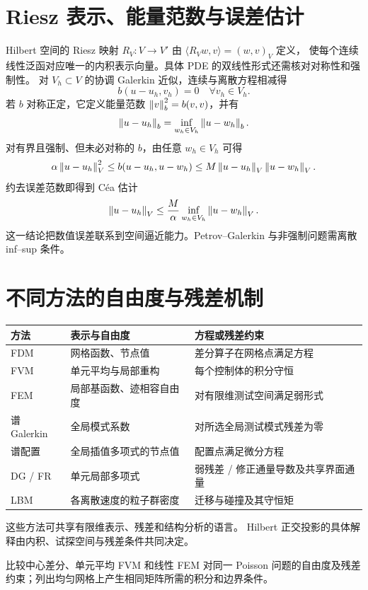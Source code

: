 \section{Riesz 表示、能量范数与误差估计}
Hilbert 空间的 Riesz 映射 $R_V:V\to V'$ 由
$\langle R_Vw,v\rangle=(w,v)_V$ 定义，
使每个连续线性泛函对应唯一的内积表示向量。具体 PDE 的双线性形式还需核对对称性和强制性。
对 $V_h\subset V$ 的协调 Galerkin 近似，连续与离散方程相减得
\[
b(u-u_h,v_h)=0\quad\forall v_h\in V_h.
\]
若 $b$ 对称正定，它定义能量范数 $\left\lVert v\right\rVert_b^2=b(v,v)$，并有
\[
\left\lVert u-u_h\right\rVert_b=\inf_{w_h\in V_h}\left\lVert u-w_h\right\rVert_b.
\]
对有界且强制、但未必对称的 $b$，由任意 $w_h\in V_h$ 可得
\[
\alpha\left\lVert u-u_h\right\rVert_V^2
\le b(u-u_h,u-w_h)
\le M\left\lVert u-u_h\right\rVert_V\left\lVert u-w_h\right\rVert_V.
\]
约去误差范数即得到 C\'ea 估计
\[
\left\lVert u-u_h\right\rVert_V\le\frac{M}{\alpha}
\inf_{w_h\in V_h}\left\lVert u-w_h\right\rVert_V.
\]
这一结论把数值误差联系到空间逼近能力。Petrov--Galerkin 与非强制问题需离散 inf--sup 条件。

\section{不同方法的自由度与残差机制}
\begin{center}\small
\begin{tabularx}{\textwidth}{@{}l>{\raggedright\arraybackslash}X>{\raggedright\arraybackslash}X@{}}
\toprule
方法 & 表示与自由度 & 方程或残差约束\\
\midrule
FDM & 网格函数、节点值 & 差分算子在网格点满足方程\\
FVM & 单元平均与局部重构 & 每个控制体的积分守恒\\
FEM & 局部基函数、迹相容自由度 & 对有限维测试空间满足弱形式\\
谱 Galerkin & 全局模式系数 & 对所选全局测试模式残差为零\\
谱配置 & 全局插值多项式的节点值 & 配置点满足微分方程\\
DG / FR & 单元局部多项式 & 弱残差 / 修正通量导数及共享界面通量\\
LBM & 各离散速度的粒子群密度 & 迁移与碰撞及其守恒矩\\
\bottomrule
\end{tabularx}
\end{center}
这些方法可共享有限维表示、残差和结构分析的语言。
Hilbert 正交投影的具体解释由内积、试探空间与残差条件共同决定。

{比较中心差分、单元平均 FVM 和线性 FEM 对同一 Poisson 问题的自由度及残差约束；列出均匀网格上产生相同矩阵所需的积分和边界条件。}

